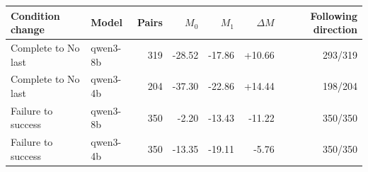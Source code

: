 \begin{tabular}{llrrrrr}
\toprule
Condition change & Model & Pairs & $M_0$ & $M_1$ & $\Delta M$ & Following direction \\
\midrule
Complete to No last & qwen3-8b & 319 & -28.52 & -17.86 & +10.66 & 293/319 \\
Complete to No last & qwen3-4b & 204 & -37.30 & -22.86 & +14.44 & 198/204 \\
Failure to success & qwen3-8b & 350 & -2.20 & -13.43 & -11.22 & 350/350 \\
Failure to success & qwen3-4b & 350 & -13.35 & -19.11 & -5.76 & 350/350 \\
\bottomrule
\end{tabular}
